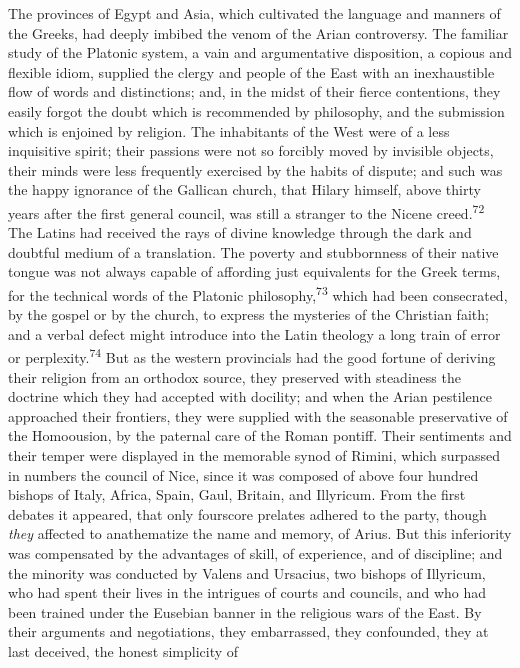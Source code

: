 The provinces of Egypt and Asia, which cultivated the language
and manners of the Greeks, had deeply imbibed the venom of the
Arian controversy. The familiar study of the Platonic system, a
vain and argumentative disposition, a copious and flexible idiom,
supplied the clergy and people of the East with an inexhaustible
flow of words and distinctions; and, in the midst of their fierce
contentions, they easily forgot the doubt which is recommended by
philosophy, and the submission which is enjoined by religion. The
inhabitants of the West were of a less inquisitive spirit; their
passions were not so forcibly moved by invisible objects, their
minds were less frequently exercised by the habits of dispute;
and such was the happy ignorance of the Gallican church, that
Hilary himself, above thirty years after the first general
council, was still a stranger to the Nicene creed.\textsuperscript{72} The Latins
had received the rays of divine knowledge through the dark and
doubtful medium of a translation. The poverty and stubbornness of
their native tongue was not always capable of affording just
equivalents for the Greek terms, for the technical words of the
Platonic philosophy,\textsuperscript{73} which had been consecrated, by the gospel
or by the church, to express the mysteries of the Christian
faith; and a verbal defect might introduce into the Latin
theology a long train of error or perplexity.\textsuperscript{74} But as the
western provincials had the good fortune of deriving their
religion from an orthodox source, they preserved with steadiness
the doctrine which they had accepted with docility; and when the
Arian pestilence approached their frontiers, they were supplied
with the seasonable preservative of the Homoousion, by the
paternal care of the Roman pontiff. Their sentiments and their
temper were displayed in the memorable synod of Rimini, which
surpassed in numbers the council of Nice, since it was composed
of above four hundred bishops of Italy, Africa, Spain, Gaul,
Britain, and Illyricum. From the first debates it appeared, that
only fourscore prelates adhered to the party, though \textit{they}
affected to anathematize the name and memory, of Arius. But this
inferiority was compensated by the advantages of skill, of
experience, and of discipline; and the minority was conducted by
Valens and Ursacius, two bishops of Illyricum, who had spent
their lives in the intrigues of courts and councils, and who had
been trained under the Eusebian banner in the religious wars of
the East. By their arguments and negotiations, they embarrassed,
they confounded, they at last deceived, the honest simplicity of
